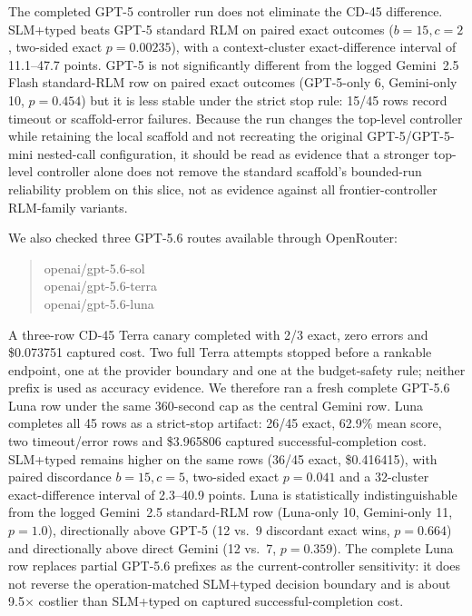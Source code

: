\documentclass[letterpaper]{article}
\begin{document}
The completed GPT-5 controller run does not eliminate the CD-45 difference. SLM+typed beats GPT-5 standard RLM on paired exact outcomes ($b=15,c=2$, two-sided exact $p=0.00235$), with a context-cluster exact-difference interval of 11.1--47.7 points. GPT-5 is not significantly different from the logged Gemini~2.5 Flash standard-RLM row on paired exact outcomes (GPT-5-only 6, Gemini-only 10, $p=0.454$) but it is less stable under the strict stop rule: 15/45 rows record timeout or scaffold-error failures. Because the run changes the top-level controller while retaining the local scaffold and not recreating the original GPT-5/GPT-5-mini nested-call configuration, it should be read as evidence that a stronger top-level controller alone does not remove the standard scaffold's bounded-run reliability problem on this slice, not as evidence against all frontier-controller RLM-family variants.

We also checked three GPT-5.6 routes available through OpenRouter:
\begin{quote}
\small\ttfamily
openai/gpt-5.6-sol\\[-1pt]
openai/gpt-5.6-terra\\[-1pt]
openai/gpt-5.6-luna
\end{quote}
A three-row CD-45 Terra canary completed with 2/3 exact, zero errors and \$0.073751 captured cost. Two full Terra attempts stopped before a rankable endpoint, one at the provider boundary and one at the budget-safety rule; neither prefix is used as accuracy evidence. We therefore ran a fresh complete GPT-5.6 Luna row under the same 360-second cap as the central Gemini row. Luna completes all 45 rows as a strict-stop artifact: 26/45 exact, 62.9\% mean score, two timeout/error rows and \$3.965806 captured successful-completion cost. SLM+typed remains higher on the same rows (36/45 exact, \$0.416415), with paired discordance $b=15,c=5$, two-sided exact $p=0.041$ and a 32-cluster exact-difference interval of 2.3--40.9 points. Luna is statistically indistinguishable from the logged Gemini~2.5 standard-RLM row (Luna-only 10, Gemini-only 11, $p=1.0$), directionally above GPT-5 (12 vs.\ 9 discordant exact wins, $p=0.664$) and directionally above direct Gemini (12 vs.\ 7, $p=0.359$). The complete Luna row replaces partial GPT-5.6 prefixes as the current-controller sensitivity: it does not reverse the operation-matched SLM+typed decision boundary and is about 9.5$\times$ costlier than SLM+typed on captured successful-completion cost.
\end{document}
